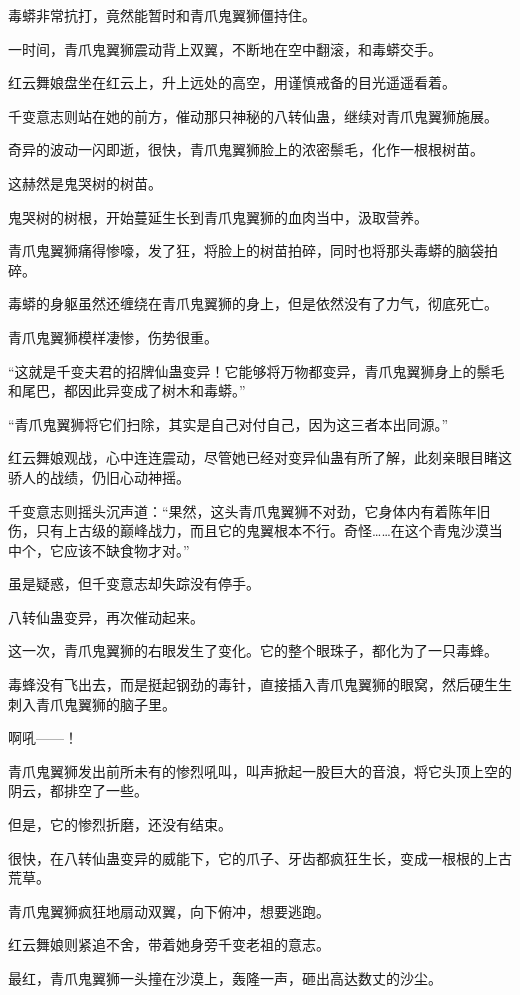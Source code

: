 \begin{this_body}
毒蟒非常抗打，竟然能暂时和青爪鬼翼狮僵持住。

一时间，青爪鬼翼狮震动背上双翼，不断地在空中翻滚，和毒蟒交手。

红云舞娘盘坐在红云上，升上远处的高空，用谨慎戒备的目光遥遥看着。

千变意志则站在她的前方，催动那只神秘的八转仙蛊，继续对青爪鬼翼狮施展。

奇异的波动一闪即逝，很快，青爪鬼翼狮脸上的浓密鬃毛，化作一根根树苗。

这赫然是鬼哭树的树苗。

鬼哭树的树根，开始蔓延生长到青爪鬼翼狮的血肉当中，汲取营养。

青爪鬼翼狮痛得惨嚎，发了狂，将脸上的树苗拍碎，同时也将那头毒蟒的脑袋拍碎。

毒蟒的身躯虽然还缠绕在青爪鬼翼狮的身上，但是依然没有了力气，彻底死亡。

青爪鬼翼狮模样凄惨，伤势很重。

“这就是千变夫君的招牌仙蛊变异！它能够将万物都变异，青爪鬼翼狮身上的鬃毛和尾巴，都因此异变成了树木和毒蟒。”

“青爪鬼翼狮将它们扫除，其实是自己对付自己，因为这三者本出同源。”

红云舞娘观战，心中连连震动，尽管她已经对变异仙蛊有所了解，此刻亲眼目睹这骄人的战绩，仍旧心动神摇。

千变意志则摇头沉声道：“果然，这头青爪鬼翼狮不对劲，它身体内有着陈年旧伤，只有上古级的巅峰战力，而且它的鬼翼根本不行。奇怪……在这个青鬼沙漠当中个，它应该不缺食物才对。”

虽是疑惑，但千变意志却失踪没有停手。

八转仙蛊变异，再次催动起来。

这一次，青爪鬼翼狮的右眼发生了变化。它的整个眼珠子，都化为了一只毒蜂。

毒蜂没有飞出去，而是挺起钢劲的毒针，直接插入青爪鬼翼狮的眼窝，然后硬生生刺入青爪鬼翼狮的脑子里。

啊吼——！

青爪鬼翼狮发出前所未有的惨烈吼叫，叫声掀起一股巨大的音浪，将它头顶上空的阴云，都排空了一些。

但是，它的惨烈折磨，还没有结束。

很快，在八转仙蛊变异的威能下，它的爪子、牙齿都疯狂生长，变成一根根的上古荒草。

青爪鬼翼狮疯狂地扇动双翼，向下俯冲，想要逃跑。

红云舞娘则紧追不舍，带着她身旁千变老祖的意志。

最红，青爪鬼翼狮一头撞在沙漠上，轰隆一声，砸出高达数丈的沙尘。


\end{this_body}

